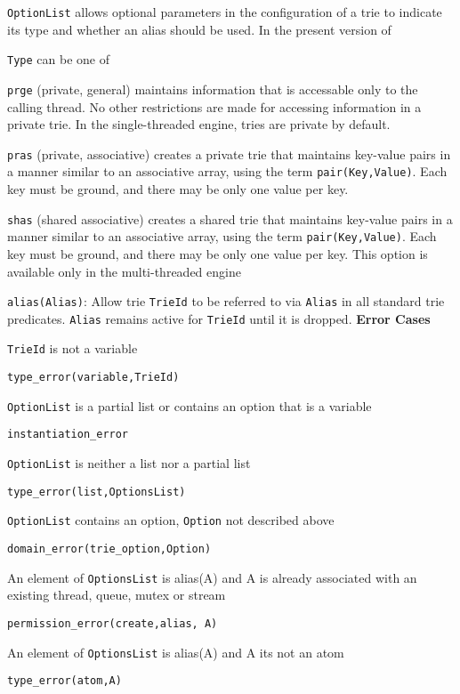 \begin{description}
%
%
{\tt OptionList} allows optional parameters in the configuration of a
trie to indicate its type and whether an alias should be used.  In the
present version of  
\bi
\item {\tt Type} can be one of
\bi
\item {\tt prge} (private, general) maintains information that is
  accessable only to the calling thread.  No other restrictions are
  made for accessing information in a private trie.  In the
  single-threaded engine, tries are private by default.

\item {\tt pras} (private, associative) creates a private trie that
  maintains key-value pairs in a manner similar to an associative
  array, using the term {\tt pair(Key,Value)}.  Each key must be ground,
  and there may be only one value per key.

\item {\tt shas} (shared associative) creates a shared trie that
  maintains key-value pairs in a manner similar to an associative
  array, using the term {\tt pair(Key,Value)}.  Each key must be
  ground, and there may be only one value per key.  This option is
  available only in the multi-threaded engine

\ei
\item {\tt alias(Alias)}: Allow trie {\tt TrieId} to be referred to
  via {\tt Alias} in all standard trie predicates.  {\tt Alias}
  remains active for {\tt TrieId} until it is dropped.
\ei
%
{\bf Error Cases}
\bi
\item 	{\tt TrieId} is not a variable
\bi
\item 	{\tt type\_error(variable,TrieId)}
\ei
\item 	{\tt OptionList} is a partial list or contains an option that is a variable
\bi
\item 	{\tt instantiation\_error}
\ei
\item 	{\tt OptionList} is neither a list nor a partial list
\bi
\item 	{\tt type\_error(list,OptionsList)}
\ei
\item 	{\tt OptionList} contains an option, {\tt Option} not described above
\bi
\item 	{\tt domain\_error(trie\_option,Option)}
\ei
\item An element of {\tt OptionsList} is alias(A) and A is already
  associated with an existing thread, queue, mutex or stream 
\bi
\item {\tt permission\_error(create,alias, A)}
\ei
\item An element of {\tt OptionsList} is alias(A) and A its not an atom
\bi
\item {\tt type\_error(atom,A)}
\ei
\ei


\end{description}
